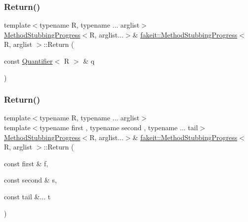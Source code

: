 \mbox{\label{structfakeit_1_1MethodStubbingProgress_acb4d4db8208a8eaadff77e7cbf3775db}} 
\subsubsection{\texorpdfstring{Return()}{Return()}\hspace{0.1cm}{\footnotesize\ttfamily [38/45]}}
{\footnotesize\ttfamily template$<$typename R, typename ... arglist$>$ \\
\mbox{\hyperlink{structfakeit_1_1MethodStubbingProgress}{Method\+Stubbing\+Progress}}$<$R, arglist...$>$\& \mbox{\hyperlink{structfakeit_1_1MethodStubbingProgress}{fakeit\+::\+Method\+Stubbing\+Progress}}$<$ R, arglist $>$\+::Return (\begin{DoxyParamCaption}\item[{const \mbox{\hyperlink{structfakeit_1_1Quantifier}{Quantifier}}$<$ R $>$ \&}]{q }\end{DoxyParamCaption})\hspace{0.3cm}{\ttfamily [inline]}}

\mbox{\label{structfakeit_1_1MethodStubbingProgress_ae8417ec5f29f70be1ae914755b05e4db}} 
\subsubsection{\texorpdfstring{Return()}{Return()}\hspace{0.1cm}{\footnotesize\ttfamily [39/45]}}
{\footnotesize\ttfamily template$<$typename R, typename ... arglist$>$ \\
template$<$typename first , typename second , typename ... tail$>$ \\
\mbox{\hyperlink{structfakeit_1_1MethodStubbingProgress}{Method\+Stubbing\+Progress}}$<$R, arglist...$>$\& \mbox{\hyperlink{structfakeit_1_1MethodStubbingProgress}{fakeit\+::\+Method\+Stubbing\+Progress}}$<$ R, arglist $>$\+::Return (\begin{DoxyParamCaption}\item[{const first \&}]{f,  }\item[{const second \&}]{s,  }\item[{const tail \&...}]{t }\end{DoxyParamCaption})\hspace{0.3cm}{\ttfamily [inline]}}

